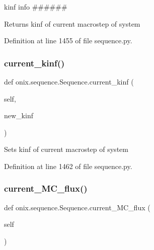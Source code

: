 kinf info \#\#\#\#\#\# 

\begin{DoxyVerb}Returns kinf of current macrostep of system\end{DoxyVerb}
 

Definition at line 1455 of file sequence.\+py.

\mbox{\label{classonix_1_1sequence_1_1Sequence_a5aa7ff064c123d8d1a7e2fc4cec77608}} 
\subsubsection{\texorpdfstring{current\+\_\+kinf()}{current\_kinf()}\hspace{0.1cm}{\footnotesize\ttfamily [2/2]}}
{\footnotesize\ttfamily def onix.\+sequence.\+Sequence.\+current\+\_\+kinf (\begin{DoxyParamCaption}\item[{}]{self,  }\item[{}]{new\+\_\+kinf }\end{DoxyParamCaption})}

\begin{DoxyVerb}Sets kinf of current macrostep of system\end{DoxyVerb}
 

Definition at line 1462 of file sequence.\+py.

\mbox{\label{classonix_1_1sequence_1_1Sequence_afddf2bf7212c5620af8955c5bff09033}} 
\subsubsection{\texorpdfstring{current\+\_\+\+M\+C\+\_\+flux()}{current\_MC\_flux()}\hspace{0.1cm}{\footnotesize\ttfamily [1/2]}}
{\footnotesize\ttfamily def onix.\+sequence.\+Sequence.\+current\+\_\+\+M\+C\+\_\+flux (\begin{DoxyParamCaption}\item[{}]{self }\end{DoxyParamCaption})}



